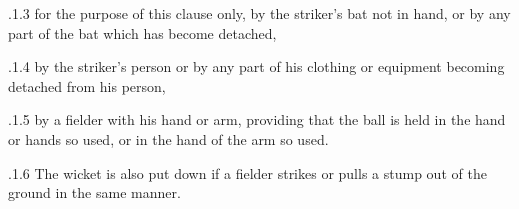 \documentclass[12pt]{article}
\begin{document}
\vspace{\baselineskip}
\begin{adjustwidth}{1.18in}{0.32in}
{\fontsize{9pt}{10.8pt}.1.3 \tabto{1.17in} for the purpose of this clause only, by the striker's bat not in hand, or by any part of the bat which has become detached,\par}\par

\end{adjustwidth}


\vspace{\baselineskip}
\begin{adjustwidth}{1.18in}{0.12in}
{\fontsize{9pt}{10.8pt}.1.4 \tabto{1.17in} by the striker’s person or by any part of his clothing or equipment becoming detached from his person,\par}\par

\end{adjustwidth}


\vspace{\baselineskip}
\begin{adjustwidth}{1.18in}{0.07in}
{\fontsize{9pt}{10.8pt}.1.5 \tabto{1.17in} by a fielder with his hand or arm, providing that the ball is held in the hand or hands so used, or in the hand of the arm so used.\par}\par

\end{adjustwidth}


\vspace{\baselineskip}

\vspace{\baselineskip}

\vspace{\baselineskip}

\vspace{\baselineskip}

\vspace{\baselineskip}
\begin{Center}
{\fontsize{8pt}{9.6pt}\par}
\end{Center}\par


\vspace{\baselineskip}

\vspace{\baselineskip}
\begin{adjustwidth}{1.18in}{0.24in}
{\fontsize{9pt}{10.8pt}.1.6 \tabto{1.17in} The wicket is also put down if a fielder strikes or pulls a stump out of the ground in the same manner.\par}\par

\end{adjustwidth}
\end{document}

